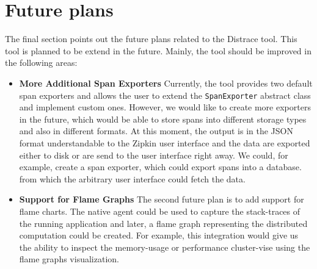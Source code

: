\section{Future plans}
 The final section points out the future plans related to the Distrace tool.
This tool is planned to be extend in the future. Mainly, the tool should be improved in the following areas:
\begin{itemize}
	\item \textbf{More Additional Span Exporters} \newline
	Currently, the tool provides two default span exporters and allows the user to extend the \texttt{SpanExporter} abstract class and implement custom ones. However, we would like to create more exporters in the future, which would be able to store spans into different storage types and also in different formats. At this moment, the output is in the JSON format understandable to the Zipkin user interface and the data are exported either to disk or are send to the user interface right away. We could, for example, create a span exporter, which could export spans into a database. from which the arbitrary user interface could fetch the data.
	\item \textbf{Support for Flame Graphs} \newline
	The second future plan is to add support for flame charts. The native agent could be used to capture the stack-traces of the running application and later, a flame graph representing the distributed computation could be created. For example, this integration would give us the ability to inspect the memory-usage or performance cluster-vise using the flame graphs visualization.
\end{itemize}

